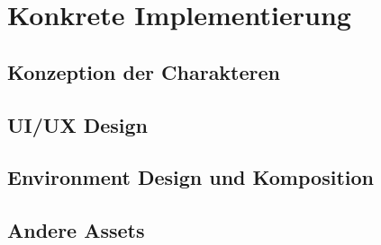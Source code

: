 \chapter{Konkrete Implementierung}
\label{cha:sa_Einleitung}

\section{Konzeption der Charakteren}

\section{UI/UX Design}

\section{Environment Design und Komposition}

\section{Andere Assets}


